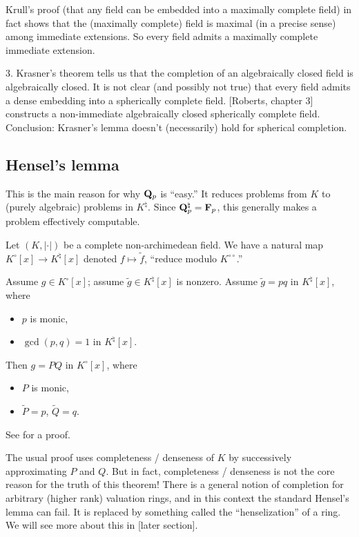 Krull's proof (that any field can be embedded into a maximally complete 
field) in fact shows that the (maximally complete) field is maximal (in a 
precise sense) among immediate extensions. So every field admits a maximally 
complete immediate extension. 

3. Krasner's theorem tells us that the completion of an algebraically closed 
field is algebraically closed. It is not clear (and possibly not true) that 
every field admits a dense embedding into a spherically complete field. 
[Roberts, chapter 3] constructs a non-immediate algebraically closed spherically 
complete field. Conclusion: Krasner's lemma doesn't (necessarily) hold for 
spherical completion. 





\subsection{Hensel's lemma}

This is the main reason for why $\mathbf{Q}_p$ is ``easy.'' It reduces problems from 
$K$ to (purely algebraic) problems in $K^\natural$. Since 
$\mathbf{Q}_p^\natural=\mathbf{F}_p$, this generally makes a problem effectively computable. 

Let $(K,|\cdot|)$ be a complete non-archimedean field. We have a natural map 
$K^\circ[x]\to K^\natural[x]$ denoted $f\mapsto \tilde f$, ``reduce modulo 
$K^{\circ\circ}$.''

\begin{theorem}[Hensel]\label{thm:Hensel}
Assume $g\in K^\circ[x]$; assume $\tilde g\in K^\natural[x]$ is nonzero. 
Assume $\tilde g=p q$ in $K^\natural[x]$, where 
\begin{itemize}
\item
$p$ is monic, 

\item
$\gcd(p,q)=1$ in $K^\natural[x]$.
\end{itemize}
Then $g=P Q$ in $K^\circ[x]$, where 
\begin{itemize}
\item $P$ is monic, 
\item $\tilde P=p$, $\tilde Q=q$. 
\end{itemize}
\end{theorem}

See \cite{bosch-2014} for a proof. 

The usual proof uses completeness / denseness of $K$ by successively 
approximating $P$ and $Q$. But in fact, completeness / denseness is not the 
core reason for the truth of this theorem! There is a general notion of 
completion for arbitrary (higher rank) valuation rings, and in this context the 
standard Hensel's lemma can fail. It is replaced by something called the 
``henselization'' of a ring. We will see more about this in [later section]. 

